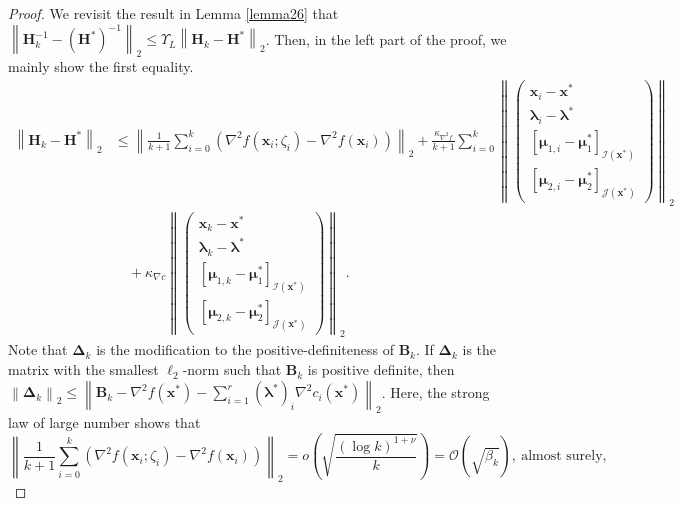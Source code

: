 \documentclass[aos]{imsart}
\numberwithin{equation}{section}
\theoremstyle{plain}
\begin{document}
\begin{appendix}
\begin{proof}
    We revisit the result in Lemma \ref{lemma26} that $\left\| \bm{H}_k^{-1} - \left(\bm{H}^{*}\right)^{-1}\right\|_2 \leq \Upsilon_{L}  \left\| \bm{H}_k - \bm{H}^{*}\right\|_2$. Then, in the left part of the proof, we mainly show the first equality. 
    \begin{equation}
    \label{eq32}
        \begin{split}
            \left\| \bm{H}_k - \bm{H}^{*}\right\|_2 & \leq \left\| \frac{1}{k +1} \sum_{i=0}^{k} \left( \nabla^2 f(\bm{x}_i;\zeta_i) - \nabla^2 f(\bm{x}_i )\right) \right\|_2 + \frac{\kappa_{\nabla^2 f}}{k +1} \sum_{i=0}^{k} \left\|  \left( \begin{array}{c}
    \bm{x}_{i} - \bm{x}^{*}  \\
    \bm{\lambda}_{i} - \bm{\lambda}^{*} \\
    \left[ \bm{\mu}_{1,i} - \bm{\mu}_{1}^{*}\right]_{\mathcal{I}(\bm{x}^{*})} \\
    \left[ \bm{\mu}_{2,i} - \bm{\mu}_{2}^{*} \right]_{\mathcal{J}(\bm{x}^{*})} 
    \end{array} \right)  \right\|_2 \\
    &  \hspace{1em} + \kappa_{\nabla c} \left\|  \left( \begin{array}{c}
    \bm{x}_{k} - \bm{x}^{*}  \\
    \bm{\lambda}_{k} - \bm{\lambda}^{*} \\
    \left[ \bm{\mu}_{1,k} - \bm{\mu}_{1}^{*}\right]_{\mathcal{I}(\bm{x}^{*})} \\
    \left[ \bm{\mu}_{2,k} - \bm{\mu}_{2}^{*} \right]_{\mathcal{J}(\bm{x}^{*})} 
    \end{array} \right)  \right\|_2.
        \end{split}
    \end{equation}
    Note that $\bm{\Delta}_k$ is the modification to the positive-definiteness of $\bm{B}_k$. If $\bm{\Delta}_k$ is the matrix with the smallest $\ell_2$-norm such that $\bm{B}_k$ is positive definite, then $\left\|\bm{\Delta}_k \right\|_2 \leq \left\| \bm{B}_k - \nabla^2 f(\bm{x}^{*}) - \sum_{i=1}^{r} (\bm{\lambda}^{*})_{i} \nabla^2 c_i(\bm{x}^{*}) \right\|_2$.
    Here, the strong law of large number shows that 
    \begin{equation}
    \label{eq31}
        \left\| \frac{1}{k+1} \sum_{i=0}^{k} \left( \nabla^2 f(\bm{x}_i;\zeta_i) - \nabla^2 f(\bm{x}_i )\right) \right\|_2 = o\left( \sqrt{\frac{\left( \log k \right)^{1+\nu}}{k}} \right) = \mathcal{O}\left(\sqrt{ \beta_k} \right), ~\text{almost surely},

\end{equation}
\end{proof}
\end{appendix}
\end{document}
